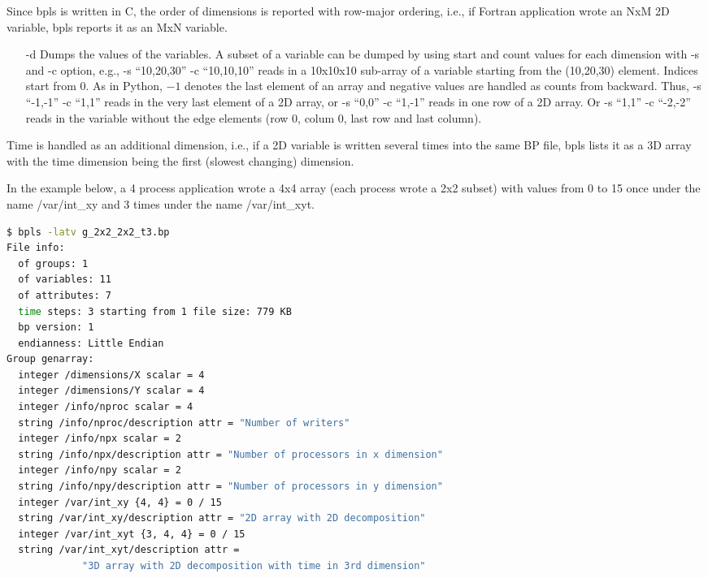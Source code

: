 Since bpls is written in C, the order of dimensions is reported with row-major 
ordering, i.e., if Fortran application wrote an NxM 2D variable, bpls reports it 
as an MxN variable. 

\begin{itemize}
\item[-d] Dumps the values of the variables. A subset of a variable can be dumped by using 
start and count values for each dimension with -s and -c option, e.g., -s ``10,20,30'' 
-c ``10,10,10'' reads in a 10x10x10 sub-array of a variable starting from the (10,20,30) 
element. Indices start from 0. As in Python, $-1$ denotes the last element of 
an array and negative values are handled as counts from backward. Thus, -s ``-1,-1'' 
-c ``1,1'' reads in the very last element of a 2D array, or -s ``0,0'' -c ``1,-1'' 
reads in one row of a 2D array. Or -s ``1,1'' -c ``-2,-2'' reads in the variable 
without the edge elements (row 0, colum 0, last row and last column).
\end{itemize}

Time is handled as an additional dimension, i.e., if a 2D variable is written several 
times into the same BP file, bpls lists it as a 3D array with the time dimension 
being the first (slowest changing) dimension. 

In the example below, a 4 process application wrote a 4x4 array (each process wrote 
a 2x2 subset) with values from 0 to 15 once under the name /var/int\_xy and 3 times 
under the name /var/int\_xyt. 

\begin{lstlisting}[language=bash,caption={bpls utility},label={}]
$ bpls -latv g_2x2_2x2_t3.bp 
File info:
  of groups: 1
  of variables: 11
  of attributes: 7
  time steps: 3 starting from 1 file size: 779 KB
  bp version: 1
  endianness: Little Endian
Group genarray:
  integer /dimensions/X scalar = 4
  integer /dimensions/Y scalar = 4
  integer /info/nproc scalar = 4
  string /info/nproc/description attr = "Number of writers"
  integer /info/npx scalar = 2
  string /info/npx/description attr = "Number of processors in x dimension"
  integer /info/npy scalar = 2
  string /info/npy/description attr = "Number of processors in y dimension"
  integer /var/int_xy {4, 4} = 0 / 15
  string /var/int_xy/description attr = "2D array with 2D decomposition"
  integer /var/int_xyt {3, 4, 4} = 0 / 15
  string /var/int_xyt/description attr = 
             "3D array with 2D decomposition with time in 3rd dimension"
\end{lstlisting}

